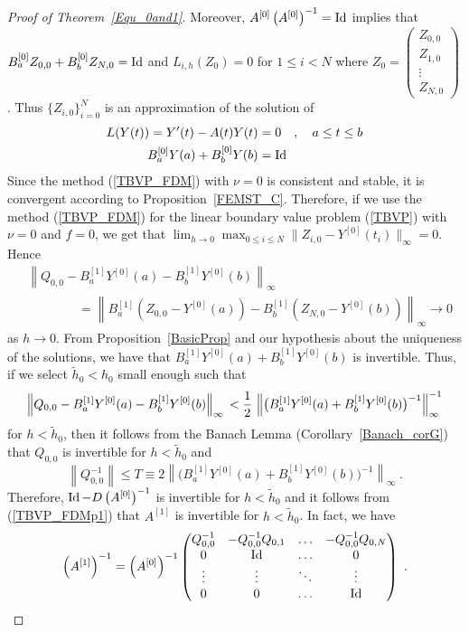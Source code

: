 \begin{proof}[Proof of Theorem~\ref{Equ_0and1}]
Moreover, $A^{[0]}\left(A^{[0]}\right)^{-1} = \operatorname{Id}$ implies that
$B_a^{[0]} Z_{0,0} + B_b^{[0]} Z_{N,0} = \operatorname{Id}$ and $L_{i,h}(Z_0) = 0$ for
$1 \leq i < N$ where
$\displaystyle Z_0 = \begin{pmatrix} Z_{0,0} \\ Z_{1,0} \\ \vdots \\
Z_{N,0} \end{pmatrix}$.
Thus $\{ Z_{i,0} \}_{i=0}^N$ is an
approximation of the solution of
\begin{align*}
L(Y(t)) = Y'(t) - A(t)Y(t) &= 0 \quad ,
\quad a \leq t \leq b\\ 
B_a^{[0]}Y(a) + B_b^{[0]}Y(b) &= \operatorname{Id}
\end{align*}
Since the method (\ref{TBVP_FDM}) with $\nu=0$ is
consistent and stable, it is convergent according to
Proposition~\ref{FEMST_C}.  Therefore, if we use the method
(\ref{TBVP_FDM}) for the linear boundary value problem
(\ref{TBVP}) with $\nu =0$ and $f=0$, we get that
$\displaystyle
\lim_{h \to 0} \max_{0\leq i \leq N} \| Z_{i,0} - Y^{[0]}(t_i)\|_\infty = 0$.
Hence
\begin{equation}\label{TBVP_FDMp2}
\begin{split}
&\left\| Q_{0,0} - B_a^{[1]}Y^{[0]}(a) -B_b^{[1]}Y^{[0]}(b) \right\|_\infty \\
&\qquad \qquad
= \left\| B_a^{[1]}(Z_{0,0} -Y^{[0]}(a)) -B_b^{[1]}(Z_{N,0} -Y^{[0]}(b))
\right\|_\infty \to 0
\end{split}
\end{equation}
as $h \to 0$.  From Proposition~\ref{BasicProp} and our hypothesis
about the uniqueness of the solutions, we have that
$B_a^{[1]} Y^{[0]}(a) + B_b^{[1]} Y^{[0]}(b)$ is invertible.  Thus, if
we select $\tilde{h}_0 < h_0$ small enough such that
\[
\left\| Q_{0,0} - B_a^{[1]}Y^{[0]}(a) -B_b^{[1]}Y^{[0]}(b) \right\|_\infty \\
< \frac{1}{2}\,\left\| \big(B_a^{[1]} Y^{[0]}(a)
  + B_b^{[1]} Y^{[0]}(b)\big)^{-1}\right\|^{-1}_\infty
\]
for $h <\tilde{h}_0$, then it follows from the Banach Lemma
(Corollary~\ref{Banach_corG}) that $Q_{0,0}$ is invertible for
$h < \tilde{h}_0$ and
\[
\left\|Q_{0,0}^{-1}\right\| \leq T \equiv
2 \left\| \big(B_a^{[1]} Y^{[0]}(a)
  + B_b^{[1]} Y^{[0]}(b)\big)^{-1}\right\|_\infty \ .
\]
Therefore, $\operatorname{Id} - D\left(A^{[0]}\right)^{-1}$
is invertible for $h < \tilde{h}_0$ and it follows from
(\ref{TBVP_FDMp1}) that $A^{[1]}$ is invertible for $h < \tilde{h}_0$.
In fact, we have
\begin{equation}\label{TBVP_FDMp3}
\left(A^{[1]}\right)^{-1} = \left(A^{[0]}\right)^{-1} \begin{pmatrix}
Q^{-1}_{0,0} & -Q^{-1}_{0,0} Q_{0,1}  &
\ldots & -Q^{-1}_{0,0} Q_{0,N} \\
0 & \operatorname{Id} & \ldots & 0 \\
\vdots & \vdots & \ddots & \vdots \\
0 & 0 & \ldots & \operatorname{Id}
\end{pmatrix} \ .
\end{equation}


\end{proof}
